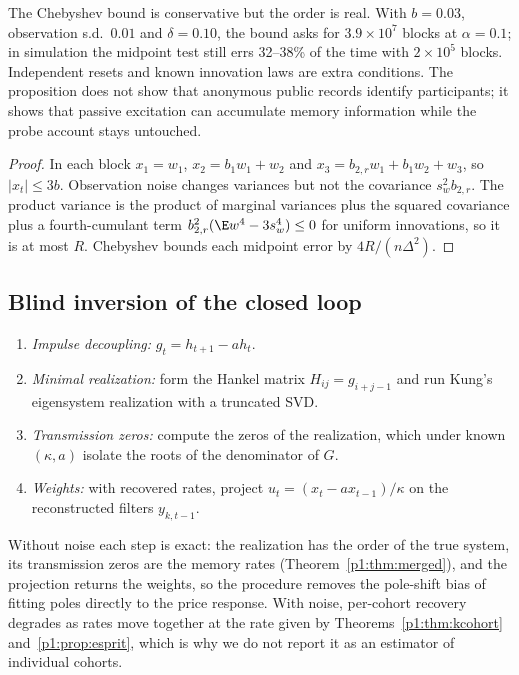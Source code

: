The Chebyshev bound is conservative but the order is real. With $b=0.03$, observation s.d.\ $0.01$ and $\delta=0.10$, the bound asks for $3.9\times10^7$ blocks at $\alpha=0.1$; in simulation the midpoint test still errs 32--38\% of the time with $2\times10^5$ blocks. Independent resets and known innovation laws are extra conditions. The proposition does not show that anonymous public records identify participants; it shows that passive excitation can accumulate memory information while the probe account stays untouched.

\begin{proof} In each block $x_1=w_1$, $x_2=b_1w_1+w_2$ and $x_3=b_{2,r}w_1+b_1w_2+w_3$, so $|x_t|\le3b$. Observation noise changes variances but not the covariance $s_w^2b_{2,r}$. The product variance is the product of marginal variances plus the squared covariance plus a fourth-cumulant term $b_{2,r}^2(\E w^4-3s_w^4)\le0$ for uniform innovations, so it is at most $R$. Chebyshev bounds each midpoint error by $4R/(n\Delta^2)$.
\end{proof}

\subsection{Blind inversion of the closed loop}\label{p1:app:era}
\begin{enumerate}[itemsep=1pt]
\item \emph{Impulse decoupling:} $g_t=h_{t+1}-ah_t$.
\item \emph{Minimal realization:} form the Hankel matrix $H_{ij}=g_{i+j-1}$ and run Kung's eigensystem realization with a truncated SVD.
\item \emph{Transmission zeros:} compute the zeros of the realization, which under known $(\kappa,a)$ isolate the roots of the denominator of $G$.
\item \emph{Weights:} with recovered rates, project $u_t=(x_t-ax_{t-1})/\kappa$ on the reconstructed filters $y_{k,t-1}$.
\end{enumerate}
Without noise each step is exact: the realization has the order of the true system, its transmission zeros are the memory rates (Theorem~\ref{p1:thm:merged}), and the projection returns the weights, so the procedure removes the pole-shift bias of fitting poles directly to the price response. With noise, per-cohort recovery degrades as rates move together at the rate given by Theorems~\ref{p1:thm:kcohort} and~\ref{p1:prop:esprit}, which is why we do not report it as an estimator of individual cohorts.

